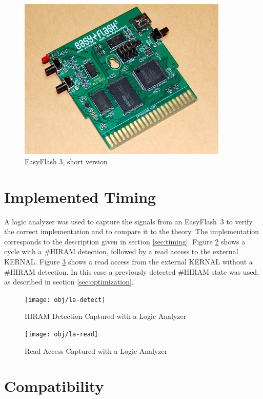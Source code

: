 \documentclass[a4paper,oneside]{memoir}
\begin{document}
\begin{figure}[!h]
    \centering
    \includegraphics[width=10cm]{src/ef3-1-1}
    \caption{EasyFlash 3, short version}
    \label{fig:ef311}
\end{figure}

\section{Implemented Timing}

A logic analyzer was used to capture the signals from an EasyFlash~3 to verify the correct implementation and to compare it to the theory. 
The implementation corresponds to the description given in section \ref{sec:timing}. Figure \ref{fig:la-detect} shows a cycle with a \#HIRAM detection, followed by a read access to the external KERNAL. Figure \ref{fig:la-read} shows a read access from the external KERNAL without a \#HIRAM detection. In this case a previously detected \#HIRAM state was used, as described in section \ref {sec:optimization}.

\begin{figure}[!h]
    \centering
    \texttt{[image: obj/la-detect]}
    \caption{HIRAM Detection Captured with a Logic Analyzer}
    \label{fig:la-detect}
\end{figure}

\begin{figure}[!h]
    \centering
    \texttt{[image: obj/la-read]}
    \caption{Read Access Captured with a Logic Analyzer}
    \label{fig:la-read}
\end{figure}

\section{Compatibility}
\end{document}
